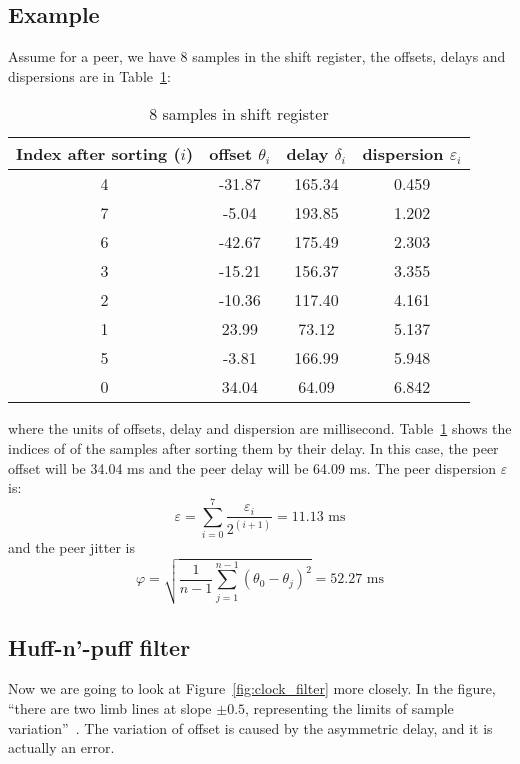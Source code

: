 \subsection{Example}%
\label{sub:example}
Assume for a peer, we have 8 samples in the shift register, the offsets, delays
and dispersions are in Table~\ref{tab:clock_filter}:
\begin{table}[htpb]
    \centering
    \caption{8 samples in shift register}
    \label{tab:clock_filter}
    \begin{tabular}{|c|c|c|c|}
        \hline
        Index after sorting ($i$) & offset $\theta_i$ & delay $\delta_i$ 
        & dispersion $\varepsilon_i$ \\
        \hline
        4& -31.87&  165.34&  0.459\\
        \hline
        7&  -5.04&  193.85&  1.202\\
        \hline
        6& -42.67&  175.49&  2.303\\
        \hline
        3& -15.21&  156.37&  3.355\\
        \hline
        2& -10.36&  117.40&  4.161\\
        \hline
        1&  23.99&   73.12&  5.137\\
        \hline
        5&  -3.81&  166.99&  5.948\\
        \hline
        0&  34.04&   64.09&  6.842\\
        \hline
    \end{tabular}
\end{table}
where the units of offsets, delay and dispersion are millisecond.
Table~\ref{tab:clock_filter} shows the indices of of the samples after sorting
them by their delay. In this case, the peer offset will be 34.04 ms and the
peer delay will be 64.09 ms. The peer dispersion $\varepsilon$ is:
$$ \varepsilon = \sum^{7}_{i=0} \frac{\varepsilon_i}{2^{(i+1)}} = 11.13
\text{ ms} $$
and the peer jitter is 
$$
    \varphi = \sqrt{\frac{1}{n-1} \sum^{n-1}_{j=1} (\theta_0 - \theta_j)^2}
    = 52.27 \text{ ms}
$$

\subsection{Huff-n'-puff filter}%
\label{sub:huff_n_puff_filter}
Now we are going to look at Figure~\ref{fig:clock_filter} more closely. In the
figure, ``there are two limb lines at slope $\pm0.5$, representing the
limits of sample variation''~\cite{clock_filter}.
The variation of offset is caused by the asymmetric delay, and it is actually
an error.

